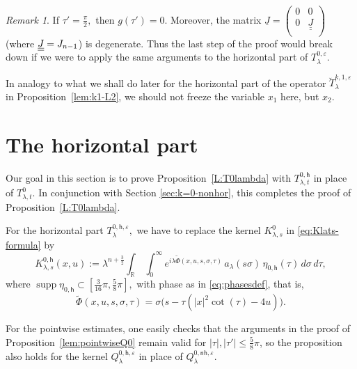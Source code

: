 \documentclass[leqno]{amsart}
\theoremstyle{definition}
\theoremstyle{remark}
\newtheorem{remark}[theorem]{Remark}
\numberwithin{equation}{section}
\newcommand{\R}{\mathbb{R}}
\DeclareMathOperator*{\supp}{supp}
\newcommand\la{{\lambda}}
\newcommand\ve{{\varepsilon}}
\begin{document}
\begin{remark}\label{breakdown}
If $\tau'=\frac{\pi}{2},$ then $g(\tau')=0.$ Moreover, the matrix 
$
\underline J=(\begin{smallmatrix}
0 & 0 \\
0 &  \underline{\underline J} \\
\end{smallmatrix})
$
(where $\smash{\underline{\underline J}}=J_{n-1}$) is degenerate.  Thus the last step of the proof would break down if we were to apply the same arguments to the horizontal part of $T^{0,\ve}_\la$. 

In analogy to what we shall do later  for the horizontal part of the operator $\breve T_{\lambda}^{k,1,\varepsilon} $ in Proposition~\ref{lem:k1-L2}, we should  not freeze the variable $x_1$ here,  but $x_2.$
\end{remark}

\section{The horizontal part}\label{sec:k=0-hor}

Our goal in this section is to prove Proposition~\ref{L:T0lambda} with $T^{0,\mathsf{h}}_{\lambda,t}$ in place of $T^0_{\lambda,t}$.  In conjunction with Section \ref{sec:k=0-nonhor}, this completes the proof of Proposition~\ref{L:T0lambda}.

For the horizontal part $T_{\lambda}^{0,\mathsf{h},\varepsilon},$ we have to replace the kernel $K_{\lambda,s}^{0}$ in \eqref{eq:Klats-formula}
 by 
 \[
K_{\lambda,s}^{0,\mathsf{h}}(x, u) := \lambda^{n+\frac32}  \int_\R \, \int_0^\infty e^{i\lambda\tilde\Phi(x,u,s,\sigma,\tau)} \, a_\lambda(s\sigma) \, \eta_{0,\mathsf{h}}( \tau)  \, d\sigma \, d\tau,
\]
where $\supp\eta_{0,\mathsf{h}}\subset [\tfrac 3{16} \pi, \tfrac 58 \pi],$   with phase as in \eqref{eq:phasesdef}, that is,
\[
\tilde \Phi(x,u,s,\sigma,\tau) =\sigma \big(s-\tau (|x|^2 \cot(\tau) - 4u)\big).
\]

For the pointwise estimates, one easily checks that the arguments in the proof of Proposition~\ref{lem:pointwiseQ0} remain valid for $|\tau|,|\tau'|\le\tfrac{5}{8}\pi$, so the proposition also holds for the kernel $Q^{0,\mathsf{h},\varepsilon}_\lambda$ in place of $Q^{0,\mathsf{nh},\varepsilon}_\lambda$.

\smallskip
\end{document}
